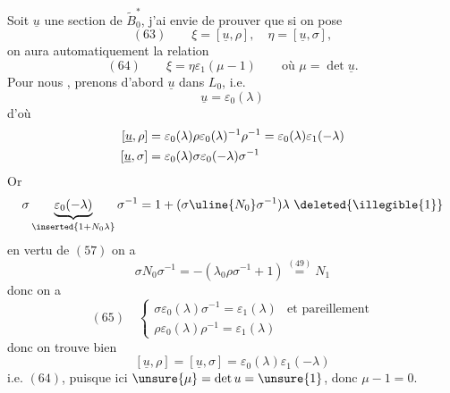 Soit $\underline u$ une section de $\widetilde B_0^*$, j'ai envie de prouver que si on pose
\[
(63)\qquad \xi=[\underline u,\rho],\quad\eta=[\underline u,\sigma],
\]
on aura automatiquement la relation
\[
(64)\qquad\xi=\eta\varepsilon_1(\mu-1)\qquad\text{où }\mu=\det\underline u.
\]
Pour nous , prenons d'abord $\underline u$ dans $L_0$, i.e.
\[
\underline u=\varepsilon_0(\lambda)
\]
d'où
\[
\begin{aligned}
\relax
[\underline u,\rho]&=\varepsilon_0(\lambda)\rho\varepsilon_0(\lambda)^{-1}\rho^{-1}
=\varepsilon_0(\lambda)\varepsilon_1(-\lambda)\\
[\underline u,\sigma]&=\varepsilon_0(\lambda)\sigma\varepsilon_0(-\lambda)\sigma^{-1}
\end{aligned}
\]
Or
\[
\sigma\underbrace{\varepsilon_0(-\lambda)}_{\inserted{1+N_0\lambda}}\sigma^{-1}
=1+(\sigma\uline{N_0}\sigma^{-1})\lambda\ \deleted{\illegible{1}}
\]
  en vertu de $(57)$ on a
\[
\sigma N_0\sigma^{-1}=-(\lambda_0\rho\sigma^{-1}+1)\overset{(49)}{=}N_1
\]
donc on a
\[
(65)\quad\left\{\begin{array}{ll}
\sigma\varepsilon_0(\lambda)\sigma^{-1}=\varepsilon_1(\lambda)&\text{et pareillement}\\
\rho\varepsilon_0(\lambda)\rho^{-1}=\varepsilon_1(\lambda)
\end{array}\right.
\]
donc on trouve bien
\[
[\underline u,\rho]=[\underline u,\sigma]=\varepsilon_0(\lambda)\varepsilon_1(-\lambda)
\]
i.e. $(64)$, puisque ici $\unsure{\mu}=\det u=\unsure{1}$, donc $\mu-1=0$.



